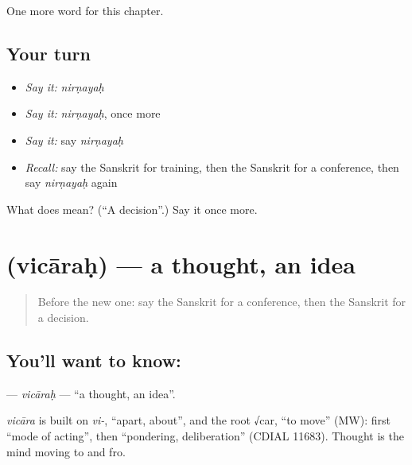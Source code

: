 \begin{grammarlens}[title={What you've built}]
One more word for this chapter.
\end{grammarlens}

\subsection*{Your turn}
\begin{itemize}
\raggedright
  \item \emph{Say it:} \emph{nirṇayaḥ}
  \item \emph{Say it:} \emph{nirṇayaḥ}, once more
  \item \emph{Say it:} say \emph{nirṇayaḥ}
  \item \emph{Recall:} say the Sanskrit for training, then the Sanskrit for a conference, then say \emph{nirṇayaḥ} again
\end{itemize}

\begin{tcolorbox}[breakable,colback=teal!4,colframe=teal!35!black,title={Before you move on}]
What does  mean? (\textquotedblleft{}A decision\textquotedblright{}.) Say it once more.
\end{tcolorbox}
\section[\texorpdfstring{\sk{विचारः} (vicāraḥ)}{विचारः (vicāraḥ)}]{ (vicāraḥ) — a thought, an idea}

\label{lesson:SA-C256-vicarah}



\begin{quote}
Before the new one: say the Sanskrit for a conference, then the Sanskrit for a decision.
\end{quote}

\subsection*{You'll want to know: }
\textbf{} — \emph{vicāraḥ} — \textquotedblleft{}a thought, an idea\textquotedblright{}.

\begin{cousinweb}
\emph{vicāra} is built on \emph{vi-}, \textquotedblleft{}apart, about\textquotedblright{}, and the root √car, \textquotedblleft{}to move\textquotedblright{} (MW): first \textquotedblleft{}mode of acting\textquotedblright{}, then \textquotedblleft{}pondering, deliberation\textquotedblright{} (CDIAL 11683). Thought is the mind moving to and fro.
\end{cousinweb}

